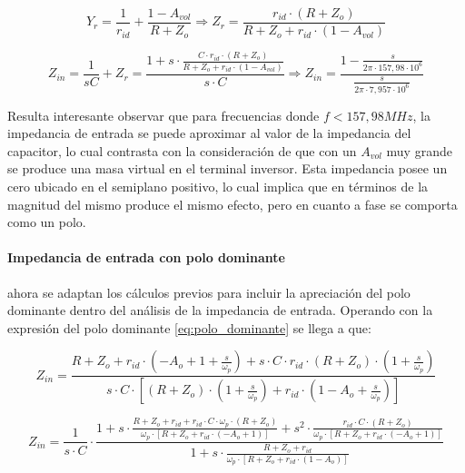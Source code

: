 \begin{equation*}
	Y_r = \frac{1}{r_{id}} + \frac{1 - A_{vol}}{R + Z_o} \Rightarrow
	Z_r = \frac{r_{id} \cdot(R + Z_o)}{R + Z_o + r_{id} \cdot(1 - A_{vol})}
\end{equation*}

\begin{equation}
	Z_{in} = \frac{1}{sC} + Z_r
	= \frac{1 + s \cdot \frac{C \cdot r_{id} \cdot (R + Z_o)}{R + Z_o + r_{id} \cdot (1 - A_{vol})}}{s \cdot C}
	\Rightarrow
	Z_{in} = \frac{1 - \frac{s}{2 \pi \cdot 157,98 \cdot 10^{6}}}{\frac{s}{2 \pi \cdot 7,957 \cdot 10^{6}}}
\end{equation}

Resulta interesante observar que para frecuencias donde $f < 157,98 MHz$, la impedancia de entrada se puede aproximar al valor de la impedancia del capacitor, lo cual contrasta con la consideraci\'on de que con un $A_{vol}$ muy grande se produce una masa virtual en el terminal inversor. Esta impedancia posee un cero ubicado en el semiplano positivo, lo cual implica que en t\'erminos de la magnitud del mismo produce el mismo efecto, pero en cuanto a fase se comporta como un polo.

\paragraph*{Impedancia de entrada con polo dominante} ahora se adaptan los c\'alculos previos para incluir la apreciaci\'on del polo dominante dentro del an\'alisis de la impedancia de entrada. Operando con la expresi\'on del polo dominante \ref{eq:polo_dominante} se llega a que:

\begin{equation*}
	Z_{in} = \frac{R + Z_o + r_{id} \cdot (-A_o + 1 + \frac{s}{\omega_p}) + s \cdot C \cdot r_{id} \cdot (R + Z_o) \cdot (1 + \frac{s}{\omega_p})}{s \cdot C \cdot \left[ (R + Z_o) \cdot (1 + \frac{s}{\omega_p}) + r_{id} \cdot (1 - A_o + \frac{s}{\omega_p}) \right]}
\end{equation*}

\begin{equation*}
	Z_{in} = \frac{1}{s \cdot C} \cdot 
	\frac{1 + s \cdot \frac{R + Z_o + r_{id} + r_{id} \cdot C \cdot \omega_p \cdot(R + Z_o)}{\omega_p \cdot \left[ R + Z_o + r_{id} \cdot (-A_o + 1) \right]} + s^{2} \cdot \frac{r_{id} \cdot C \cdot (R + Z_o)}{\omega_p \cdot \left[ R + Z_o + r_{id} \cdot (-A_o + 1) \right]}}{1 + s \cdot \frac{R + Z_o + r_{id}}{\omega_p \cdot \left[ R + Z_o + r_{id} \cdot (1 - A_o)\right]}}
\end{equation*}

